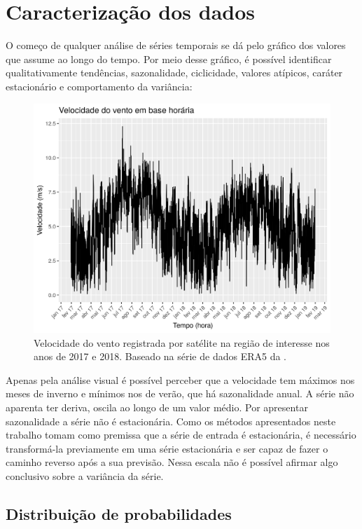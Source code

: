 \documentclass[
	12pt,				%
	openright,			%
	oneside,			%
	a4paper,			%
	english,			%
	french,				%
	spanish,			%
	brazil				%
	]{abntex2}
\begin{document}
\chapter{Caracterização dos dados}

O começo de qualquer análise de séries temporais se dá pelo gráfico dos valores que assume ao longo do tempo. Por meio desse gráfico, é possível identificar qualitativamente tendências, sazonalidade, ciclicidade, valores atípicos, caráter estacionário e comportamento da variância:

\begin{figure}[h]
    \centering
	\includegraphics[width=\textwidth]{entire_series_hourly_basis.png}
	\caption{Velocidade do vento registrada por satélite na região de interesse nos anos de 2017 e 2018. Baseado na série de dados ERA5 da \cite{era5}.}
\end{figure}
\FloatBarrier

Apenas pela análise visual é possível perceber que a velocidade tem máximos nos meses de inverno e mínimos nos de verão, que há sazonalidade anual. A série não aparenta ter deriva, oscila ao longo de um valor médio. Por apresentar sazonalidade a série não é estacionária. Como os métodos apresentados neste trabalho tomam como premissa que a série de entrada é estacionária, é necessário transformá-la previamente em uma série estacionária e ser capaz de fazer o caminho reverso após a sua previsão. Nessa escala não é possível afirmar algo conclusivo sobre a variância da série.

\section{Distribuição de probabilidades}
\end{document}
